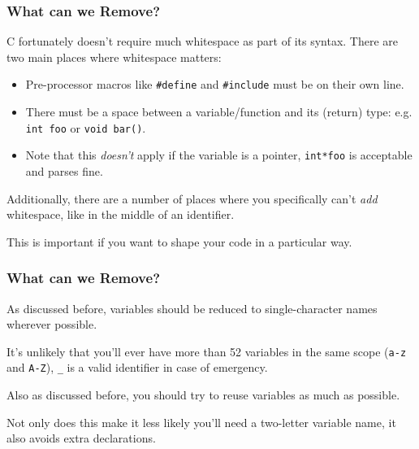 \documentclass[handout,xcolor]{beamer}
\begin{document}
\begin{frame}
	\frametitle{What can we Remove?}
	\pause
	
	C fortunately doesn't require much whitespace as part of its syntax. \pause There are two main places where whitespace matters:
	\pause

	\begin{itemize}
		\item Pre-processor macros like \texttt{\#define} and \texttt{\#include} must be on their own line.
		\pause
		
		\item There must be a space between a variable/function and its (return) type: e.g. \texttt{int foo} or \texttt{void bar()}.
		\pause
		
		\item Note that this \textit{doesn't} apply if the variable is a pointer, \texttt{int*foo} is acceptable and parses fine.
	\end{itemize}
	\pause

	Additionally, there are a number of places where you specifically can't \textit{add} whitespace, like in the middle of an identifier.
	\pause
	
	This is important if you want to shape your code in a particular way.
\end{frame}

\begin{frame}
	\frametitle{What can we Remove?}
	\pause
	
	As discussed before, variables should be reduced to single-character names wherever possible.
	\pause
	
	It's unlikely that you'll ever have more than 52 variables in the same scope (\texttt{a-z} and \texttt{A-Z}), \pause \texttt{\_} is a valid identifier in case of emergency.
	\pause

	Also as discussed before, you should try to reuse variables as much as possible.
	\pause
	
	Not only does this make it less likely you'll need a two-letter variable name, it also avoids extra declarations.
\end{frame}
\end{document}
